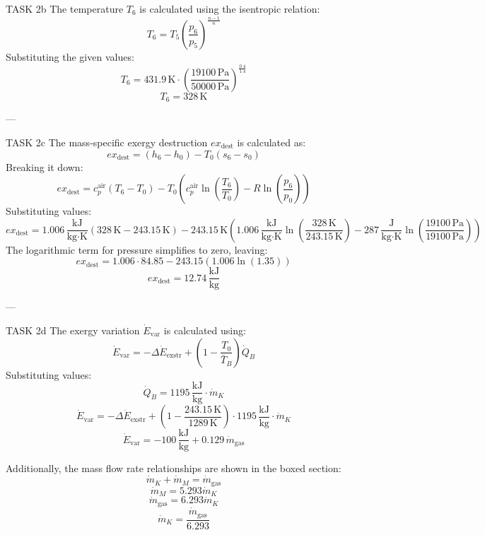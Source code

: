 TASK 2b  
The temperature \( T_6 \) is calculated using the isentropic relation:  
\[
T_6 = T_5 \left( \frac{p_6}{p_5} \right)^{\frac{n-1}{n}}
\]  
Substituting the given values:  
\[
T_6 = 431.9 \, \text{K} \cdot \left( \frac{19100 \, \text{Pa}}{50000 \, \text{Pa}} \right)^{\frac{0.4}{1.4}}
\]  
\[
T_6 = 328 \, \text{K}
\]  

---

TASK 2c  
The mass-specific exergy destruction \( ex_{\text{dest}} \) is calculated as:  
\[
ex_{\text{dest}} = (h_6 - h_0) - T_0 (s_6 - s_0)
\]  
Breaking it down:  
\[
ex_{\text{dest}} = c_p^{\text{air}} (T_6 - T_0) - T_0 \left( c_p^{\text{air}} \ln \left( \frac{T_6}{T_0} \right) - R \ln \left( \frac{p_6}{p_0} \right) \right)
\]  
Substituting values:  
\[
ex_{\text{dest}} = 1.006 \, \frac{\text{kJ}}{\text{kg·K}} (328 \, \text{K} - 243.15 \, \text{K}) - 243.15 \, \text{K} \left( 1.006 \, \frac{\text{kJ}}{\text{kg·K}} \ln \left( \frac{328 \, \text{K}}{243.15 \, \text{K}} \right) - 287 \, \frac{\text{J}}{\text{kg·K}} \ln \left( \frac{19100 \, \text{Pa}}{19100 \, \text{Pa}} \right) \right)
\]  
The logarithmic term for pressure simplifies to zero, leaving:  
\[
ex_{\text{dest}} = 1.006 \cdot 84.85 - 243.15 \left( 1.006 \ln(1.35) \right)
\]  
\[
ex_{\text{dest}} = 12.74 \, \frac{\text{kJ}}{\text{kg}}
\]  

---

TASK 2d  
The exergy variation \( \dot{E}_{\text{var}} \) is calculated using:  
\[
\dot{E}_{\text{var}} = -\Delta \dot{E}_{\text{exstr}} + \left( 1 - \frac{T_0}{\bar{T}_B} \right) \dot{Q}_B
\]  
Substituting values:  
\[
\dot{Q}_B = 1195 \, \frac{\text{kJ}}{\text{kg}} \cdot \dot{m}_K
\]  
\[
\dot{E}_{\text{var}} = -\Delta \dot{E}_{\text{exstr}} + \left( 1 - \frac{243.15 \, \text{K}}{1289 \, \text{K}} \right) \cdot 1195 \, \frac{\text{kJ}}{\text{kg}} \cdot \dot{m}_K
\]  
\[
\dot{E}_{\text{var}} = -100 \, \frac{\text{kJ}}{\text{kg}} + 0.129 \, \dot{m}_{\text{gas}}
\]  

Additionally, the mass flow rate relationships are shown in the boxed section:  
\[
\dot{m}_K + \dot{m}_M = \dot{m}_{\text{gas}}
\]  
\[
\dot{m}_M = 5.293 \dot{m}_K
\]  
\[
\dot{m}_{\text{gas}} = 6.293 \dot{m}_K
\]  
\[
\dot{m}_K = \frac{\dot{m}_{\text{gas}}}{6.293}
\]